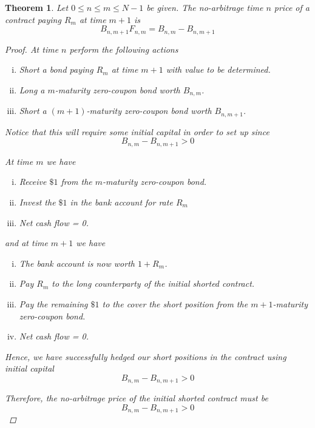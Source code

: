 \documentclass[12pt]{article}
\newtheorem{theorem}{Theorem}
\begin{document}
\begin{theorem} Let $0 \leq n \leq m \leq N - 1$ be given. The no-arbitrage time $n$ price of a contract paying $R_m$ at time $m + 1$ is
\begin{equation*}
	B_{n, m + 1} F_{n,m} = B_{n,m} - B_{n, m + 1}
\end{equation*}	

\begin{proof} At time $n$ perform the following actions
\begin{enumerate}[(i)]
	\item Short a bond paying $R_m$ at time $m + 1$ with value to be determined.
	\item Long a $m$-maturity zero-coupon bond worth $B_{n,m}$.
	\item Short a $(m + 1)$-maturity zero-coupon bond worth $B_{n, m + 1}$.
\end{enumerate}

Notice that this will require some initial capital in order to set up since 
\begin{equation*}
	B_{n,m} - B_{n, m + 1} > 0
\end{equation*}

At time $m$ we have
\begin{enumerate}[(i)]
	\item Receive $\$1$ from the $m$-maturity zero-coupon bond.
	\item Invest the $\$1$ in the bank account for rate $R_m$
	\item Net cash flow = 0.
\end{enumerate}

and at time $m + 1$ we have
\begin{enumerate}[(i)]
	\item The bank account is now worth $1 + R_m$.
	\item Pay $R_m$ to the long counterparty of the initial shorted contract.
	\item Pay the remaining $\$1$ to the cover the short position from the $m + 1$-maturity zero-coupon bond.
	\item Net cash flow = 0.
\end{enumerate}

Hence, we have successfully hedged our short positions in the contract using initial capital
\begin{equation*}
	B_{n,m} - B_{n,m + 1} > 0
\end{equation*}

Therefore, the no-arbitrage price of the initial shorted contract must be
\begin{equation*}
	B_{n,m} - B_{n, m + 1} > 0
\end{equation*}


\end{proof}
\end{theorem}
\end{document}
